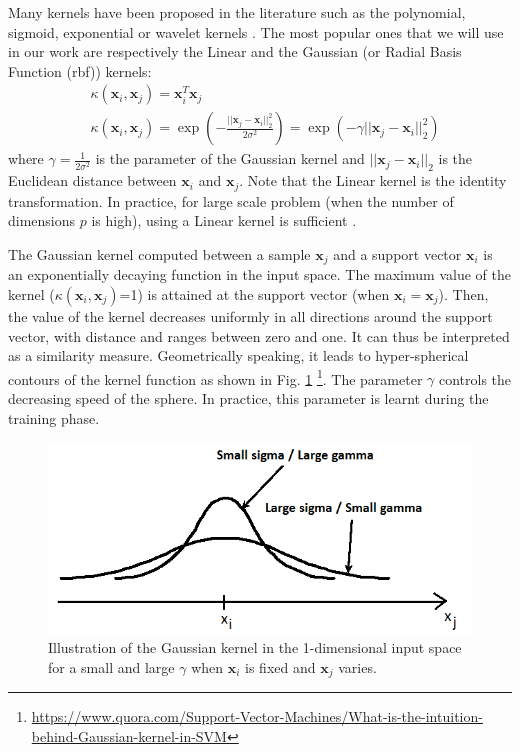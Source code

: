 Many kernels have been proposed in the literature such as the polynomial, sigmoid, exponential or wavelet kernels \cite{Schlkopf2013}. The most popular ones that we will use in our work are respectively the Linear and the Gaussian (or Radial Basis Function ({\sc rbf})) kernels:
\begin{align}
	& \kappa(\textbf{x}_i,\textbf{x}_j)= \textbf{x}_i ^T \textbf{x}_j \\
	& \kappa(\textbf{x}_i,\textbf{x}_j)
	= \exp\left( -\frac{||\textbf{x}_j-\textbf{x}_i||_2^2}{2\sigma^2}\right) 
	= \exp\left( -\gamma||\textbf{x}_j-\textbf{x}_i||_2^2\right) 
\end{align}
where $\gamma = \frac{1}{2\sigma^2}$ is the parameter of the Gaussian kernel and $||\textbf{x}_j-\textbf{x}_i||_2$ is the Euclidean distance between $\textbf{x}_i$ and $\textbf{x}_j$. Note that the Linear kernel is the identity transformation. In practice, for large scale problem (when the number of dimensions $p$ is high), using a Linear kernel is sufficient  \cite{Fan2008}.

The Gaussian kernel computed between a sample $\textbf{x}_j$ and a support vector $\textbf{x}_i$ is an exponentially decaying function in the input space. The maximum value of the kernel ($\kappa(\textbf{x}_i,\textbf{x}_j)$=1) is attained at the support vector (when $\textbf{x}_i=\textbf{x}_j$). Then, the value of the kernel decreases uniformly in all directions around the support vector, with distance and ranges between zero and one. It can thus be interpreted as a similarity measure. Geometrically speaking, it leads to hyper-spherical contours of the kernel function as shown in Fig. \ref{fig:Kernel_Gaussian} \footnote{\url{https://www.quora.com/Support-Vector-Machines/What-is-the-intuition-behind-Gaussian-kernel-in-SVM}}. The parameter $\gamma$ controls the decreasing speed of the sphere. In practice, this parameter is learnt during the training phase.

\begin{figure}[h!]
\centering
\includegraphics[width=0.6\linewidth]{images/Kernel_Gaussian2}
\caption{Illustration of the Gaussian kernel in the 1-dimensional input space for a small and large $\gamma$ when $\textbf{x}_i$ is fixed and $\textbf{x}_j$ varies.}
\label{fig:Kernel_Gaussian}
\end{figure}


